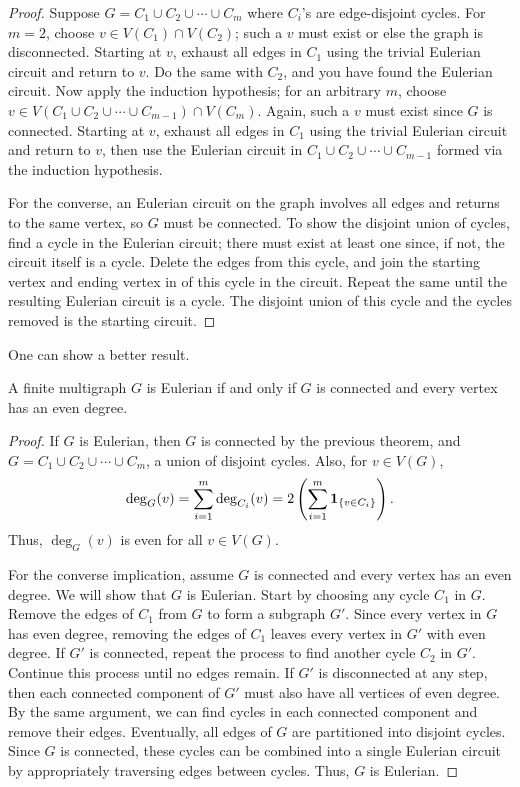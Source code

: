 \begin{proof}
    Suppose $G = C_{1} \cup C_{2} \cup \cdots \cup C_{m}$ where $C_{i}$'s are edge-disjoint cycles. For $m = 2$, choose $v \in V(C_{1}) \cap V(C_{2})$; such a $v$ must exist or else the graph is disconnected. Starting at $v$, exhaust all edges in $C_{1}$ using the trivial Eulerian circuit and return to $v$. Do the same with $C_{2}$, and you have found the Eulerian circuit. Now apply the induction hypothesis; for an arbitrary $m$, choose $v \in V(C_{1} \cup C_{2} \cup \cdots \cup C_{m-1}) \cap V(C_{m})$. Again, such a $v$ must exist since $G$ is connected. Starting at $v$, exhaust all edges in $C_{1}$ using the trivial Eulerian circuit and return to $v$, then use the Eulerian circuit in $C_{1} \cup C_{2} \cup \cdots \cup C_{m-1}$ formed via the induction hypothesis.

    For the converse, an Eulerian circuit on the graph involves all edges and returns to the same vertex, so $G$ must be connected. To show the disjoint union of cycles, find a cycle in the Eulerian circuit; there must exist at least one since, if not, the circuit itself is a cycle. Delete the edges from this cycle, and join the starting vertex and ending vertex in of this cycle in the circuit. Repeat the same until the resulting Eulerian circuit is a cycle. The disjoint union of this cycle and the cycles removed is the starting circuit.
\end{proof}

One can show a better result.

\begin{theorem}
    A finite multigraph $G$ is Eulerian if and only if $G$ is connected and every vertex has an even degree.
\end{theorem}

\begin{proof}
    If $G$ is Eulerian, then $G$ is connected by the previous theorem, and $G = C_{1} \cup C_{2} \cup \cdots \cup C_{m}$, a union of disjoint cycles. Also, for $v \in V(G)$,
    \begin{align}
        \deg_{G}(v) = \sum_{i=1}^{m} \deg_{C_{i}}(v) = 2 \left( \sum_{i=1}^{m} \textbf{1}_{\{v \in C_{i}\}} \right).
    \end{align}
    Thus, $\deg_{G}(v)$ is even for all $v \in V(G)$.

    For the converse implication, assume $G$ is connected and every vertex has an even degree. We will show that $G$ is Eulerian. Start by choosing any cycle $C_{1}$ in $G$. Remove the edges of $C_{1}$ from $G$ to form a subgraph $G'$. Since every vertex in $G$ has even degree, removing the edges of $C_{1}$ leaves every vertex in $G'$ with even degree. If $G'$ is connected, repeat the process to find another cycle $C_{2}$ in $G'$. Continue this process until no edges remain. If $G'$ is disconnected at any step, then each connected component of $G'$ must also have all vertices of even degree. By the same argument, we can find cycles in each connected component and remove their edges. Eventually, all edges of $G$ are partitioned into disjoint cycles. Since $G$ is connected, these cycles can be combined into a single Eulerian circuit by appropriately traversing edges between cycles. Thus, $G$ is Eulerian.
\end{proof}

